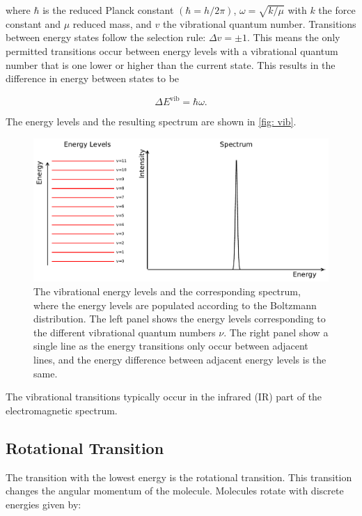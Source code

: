 \documentclass[oneside, single, authoryear, semicolon, 12pt]{lion-msc}
\newcommand{\4}{$_4$}
\newcommand{\3}{$_3$}
\newcommand{\2}{$_2$}
\begin{document}
where $\hbar$ is the reduced Planck constant $\left(\hbar=h/2\pi\right)$, $\omega=\sqrt{k/\mu}$ with $k$ the force constant and $\mu$ reduced mass, and $v$ the vibrational quantum number. Transitions between energy states follow the selection rule: $\Delta v=\pm 1$. This means the only permitted transitions occur between energy levels with a vibrational quantum number that is one lower or higher than the current state. This results in the difference in energy between states to be

\begin{equation}
    \Delta E^{\mathrm{vib}}=\hbar\omega.
\end{equation}

The energy levels and the resulting spectrum are shown in \autoref{fig: vib}.

\begin{figure}[H]
    \centering
    \includegraphics[width=\linewidth]{Figures/VibSpectrum.pdf}
    \caption{The vibrational energy levels and the corresponding spectrum, where the energy levels are populated according to the Boltzmann distribution. The left panel shows the energy levels corresponding to the different vibrational quantum numbers $\nu$. The right panel show a single line as the energy transitions only occur between adjacent lines, and the energy difference between adjacent energy levels is the same.}
    \label{fig: vib}
\end{figure}

The vibrational transitions typically occur in the infrared (IR) part of the electromagnetic spectrum. 


\subsection{Rotational Transition}
The transition with the lowest energy is the rotational transition. This transition changes the angular momentum of the molecule. Molecules rotate with discrete energies given by:
\end{document}

